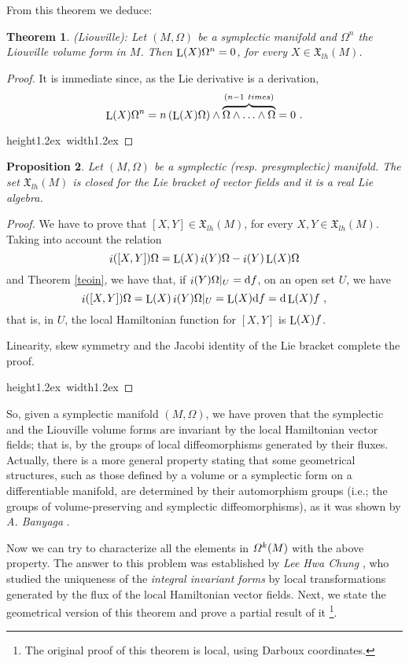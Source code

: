 \documentclass[12pt]{report}
\newtheorem{teor}{Theorem}[chapter]
\newtheorem{prop}[teor]{Proposition}
\def\dst{\displaystyle}
\def\qed{\ifvmode\removelastskip\fi
{\unskip\nobreak\hfil\penalty50\hbox{}\nobreak\hfil
\hbox{\vrule height1.2ex width1.2ex}\parfillskip=0pt
\finalhyphendemerits=0 \par\smallskip}}
\def\vf{\mathfrak X}
\def\d{{\rm d}}
\def\Lie{\mathop{\rm L}\nolimits}
\def\inn{\mathop{i}\nolimits}
\begin{document}
From this theorem we deduce:

\begin{teor} {\rm (Liouville)}:
Let $(M,\Omega )$ be a symplectic manifold
and $\Omega^n$ the Liouville volume form in $M$.
Then $\Lie (X)\Omega^n =0$, for every $X \in \vf_{lh}(M)$.
\end{teor}
\begin{proof}
It is immediate since, as the Lie derivative is a derivation,
\vspace{-3mm}
$$
\Lie (X)\Omega^n =n\,(\Lie (X)\Omega)\wedge
\overbrace{\Omega\wedge\ldots\wedge\Omega}^{(n-1\ times)}=0 \ .
$$
\qed  \end{proof}

\begin{prop}
Let $(M,\Omega )$ be a symplectic (resp. presymplectic) manifold.
The set $\vf_{lh}(M)$ is closed for the Lie bracket of vector fields
and it is a  real Lie algebra.
\label{allie}
\end{prop}
\begin{proof}
We have to prove that $[X,Y]\in\vf_{lh}(M)$, for every $X,Y\in\vf_{lh}(M)$. 
Taking into account the relation
$$
\inn([X,Y])\Omega =
\Lie (X)\inn(Y)\Omega - \inn(Y)\Lie (X)\Omega
$$
and Theorem \ref{teoin}, we have that, if \(\dst\inn (Y)\Omega\vert_U=\d f\), on an open set $U$, we have
$$
\inn([X,Y])\Omega =\Lie (X)\inn(Y)\Omega\vert_U=\Lie(X)\d f=\d\Lie(X)f \ ,
$$
that is, in $U$, the local Hamiltonian function for $[X,Y]$ is $\Lie(X)f$.

Linearity, skew symmetry and the Jacobi identity of the Lie bracket
complete the proof.
\\ \qed  \end{proof}

So, given a symplectic manifold
$(M,\Omega )$, we have proven that the symplectic and the Liouville volume forms are invariant
by the local Hamiltonian vector fields; that is,
by the groups of local diffeomorphisms generated by their fluxes. 
Actually, there is a more general property stating that some geometrical structures,
such as those defined by a volume or a symplectic
form on a differentiable manifold,
are determined by their automorphism groups
(i.e.; the groups of volume-preserving and symplectic diffeomorphisms), as it was shown by {\it A. Banyaga} \cite{Ba86,Ba88,Ba97}.
 

Now we can try to characterize all the elements in
${\mit\Omega}^k(M)$ with the above property.
The answer to this problem was established by
{\it Lee Hwa Chung} \cite{Hw-47}, who studied the uniqueness
of  the {\sl  integral invariant forms} by local transformations generated
by the flux of  the local Hamiltonian vector fields.
Next, we state the geometrical version of this theorem and prove a partial result of it
\footnote{
The original proof of this theorem is local, using Darboux coordinates.}.
\end{document}

